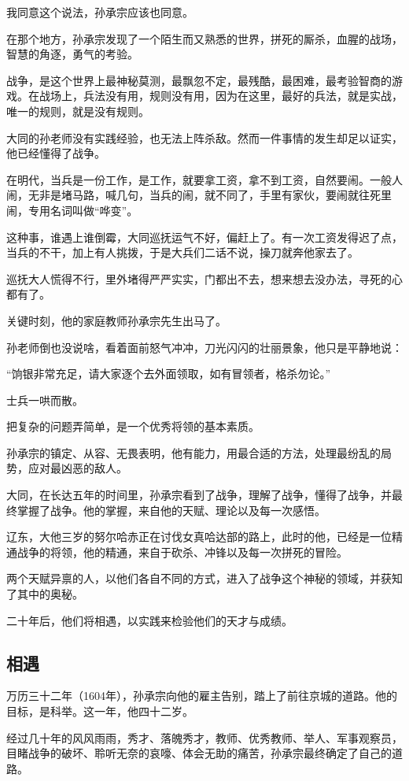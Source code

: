 \begin{multicols}{\theparacolNo}
		我同意这个说法，孙承宗应该也同意。

		在那个地方，孙承宗发现了一个陌生而又熟悉的世界，拼死的厮杀，血腥的战场，智慧的角逐，勇气的考验。

		战争，是这个世界上最神秘莫测，最飘忽不定，最残酷，最困难，最考验智商的游戏。在战场上，兵法没有用，规则没有用，因为在这里，最好的兵法，就是实战，唯一的规则，就是没有规则。

		大同的孙老师没有实践经验，也无法上阵杀敌。然而一件事情的发生却足以证实，他已经懂得了战争。

		在明代，当兵是一份工作，是工作，就要拿工资，拿不到工资，自然要闹。一般人闹，无非是堵马路，喊几句，当兵的闹，就不同了，手里有家伙，要闹就往死里闹，专用名词叫做“哗变”。

		这种事，谁遇上谁倒霉，大同巡抚运气不好，偏赶上了。有一次工资发得迟了点，当兵的不干，加上有人挑拨，于是大兵们二话不说，操刀就奔他家去了。

		巡抚大人慌得不行，里外堵得严严实实，门都出不去，想来想去没办法，寻死的心都有了。

		关键时刻，他的家庭教师孙承宗先生出马了。

		孙老师倒也没说啥，看着面前怒气冲冲，刀光闪闪的壮丽景象，他只是平静地说：

		“饷银非常充足，请大家逐个去外面领取，如有冒领者，格杀勿论。”

		士兵一哄而散。

		把复杂的问题弄简单，是一个优秀将领的基本素质。

		孙承宗的镇定、从容、无畏表明，他有能力，用最合适的方法，处理最纷乱的局势，应对最凶恶的敌人。

		大同，在长达五年的时间里，孙承宗看到了战争，理解了战争，懂得了战争，并最终掌握了战争。他的掌握，来自他的天赋、理论以及每一次感悟。

		辽东，大他三岁的努尔哈赤正在讨伐女真哈达部的路上，此时的他，已经是一位精通战争的将领，他的精通，来自于砍杀、冲锋以及每一次拼死的冒险。

		两个天赋异禀的人，以他们各自不同的方式，进入了战争这个神秘的领域，并获知了其中的奥秘。

		二十年后，他们将相遇，以实践来检验他们的天才与成绩。

		\subsection{相遇}
		万历三十二年（1604年），孙承宗向他的雇主告别，踏上了前往京城的道路。他的目标，是科举。这一年，他四十二岁。

		经过几十年的风风雨雨，秀才、落魄秀才，教师、优秀教师、举人、军事观察员，目睹战争的破坏、聆听无奈的哀嚎、体会无助的痛苦，孙承宗最终确定了自己的道路。


\end{multicols}

